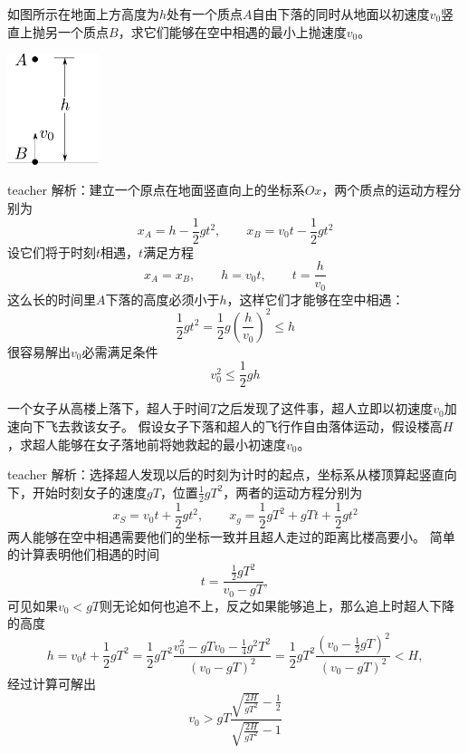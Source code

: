 \begin{example}
如图所示在地面上方高度为$h$处有一个质点$A$自由下落的同时从地面以初速度$v_0$竖直上抛另一个质点$B$，求它们能够在空中相遇的最小上抛速度$v_0$。
\begin{flushright}
\includegraphics[width = 0.2\textwidth]{images/motion-one-up-one-down.pdf} 
\end{flushright}
\begin{taggedblock}{teacher}
\noindent
解析：建立一个原点在地面竖直向上的坐标系$Ox$，两个质点的运动方程分别为
\[x_A= h-\frac{1}{2}gt^2,\qquad x_B = v_0 t-\frac{1}{2}gt^2\]
设它们将于时刻$t$相遇，$t$满足方程
\[x_A = x_B,\qquad h = v_0 t,\qquad t=\frac{h}{v_0}\]
这么长的时间里$A$下落的高度必须小于$h$，这样它们才能够在空中相遇：
\[
\frac{1}{2}gt^2=\frac{1}{2}g(\frac{h}{v_0})^2\le h
\]
很容易解出$v_0$必需满足条件
\[ v_0^2\le \frac{1}{2}gh\]
\end{taggedblock}
\end{example}

\begin{example}
一个女子从高楼上落下，超人于时间$T$之后发现了这件事，超人立即以初速度$v_0$加速向下飞去救该女子。
假设女子下落和超人的飞行作自由落体运动，假设楼高$H$，求超人能够在女子落地前将她救起的最小初速度$v_0$。

\begin{taggedblock}{teacher}
\noindent
解析：选择超人发现以后的时刻为计时的起点，坐标系从楼顶算起竖直向下，开始时刻女子的速度$gT$，位置$\frac{1}{2}gT^2$，两者的运动方程分别为
\[
x_S = v_0t+\frac{1}{2}gt^2,\qquad x_g = \frac{1}{2}gT^2+gTt+\frac{1}{2}gt^2
\]
两人能够在空中相遇需要他们的坐标一致并且超人走过的距离比楼高要小。
简单的计算表明他们相遇的时间
\[
t = \frac{\frac{1}{2}gT^2}{v_0-gT},
\]
可见如果$v_0<gT$则无论如何也追不上，反之如果能够追上，那么追上时超人下降的高度
\[
h = v_0t+\frac{1}{2}gT^2 = \frac{1}{2}gT^2\frac{v_0^2-gTv_0-\frac{1}{4}g^2T^2}{(v_0-gT)^2} = \frac{1}{2}gT^2\frac{(v_0-\frac{1}{2}gT)^2}{(v_0-gT)^2}<H,
\]
经过计算可解出
\[
v_0>gT\frac{\sqrt{\frac{2H}{gT^2}}-\frac{1}{2}}{\sqrt{\frac{2H}{gT^2}}-1}
\]
\end{taggedblock}
\end{example}

